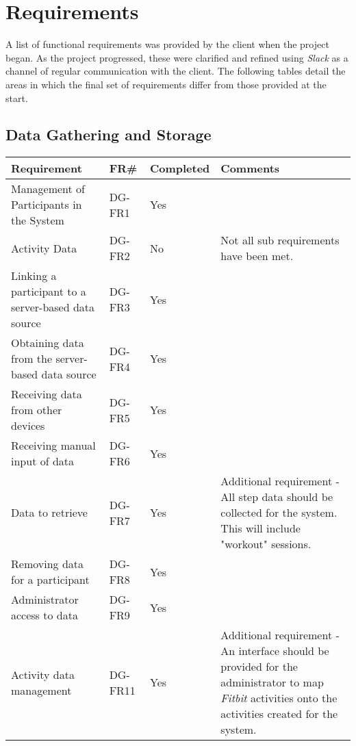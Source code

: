 \label{Requirements_chpt}
\chapter{Requirements}

A list of functional requirements was provided by the client when the project began. As the project progressed, these were clarified and refined using \textit{Slack}\cite{slack} as a channel of regular communication with the client. The following tables detail the areas in which the final set of requirements differ from those provided at the start.

\section{Data Gathering and Storage}
\begin{tabular}{ |p{5cm}|l|l|p{8cm}|}
\hline
\textbf{Requirement}	&	\textbf{FR\#}	&	\textbf{Completed}	&	\textbf{Comments} \\
\hline
Management of Participants in the System			& DG-FR1	& Yes	&  \\
\hline
Activity Data										& DG-FR2	& No	& Not all sub requirements have been met. \\
\hline
Linking a participant to a server-based data source	& DG-FR3	& Yes	&  \\
\hline
Obtaining data from the server-based data source	& DG-FR4	& Yes	&  \\
\hline
Receiving data from other devices					& DG-FR5	& Yes	&  \\
\hline
Receiving manual input of data						& DG-FR6	& Yes	&  \\
\hline
Data to retrieve 									& DG-FR7	& Yes	& Additional requirement - All step data should be collected for the system. This will include "workout" sessions. \\
\hline
Removing data for a participant						& DG-FR8	& Yes	&  \\
\hline
Administrator access to data						& DG-FR9	& Yes	&  \\
\hline
Activity data management							& DG-FR11	& Yes	& Additional requirement - An interface should be provided for the administrator to map \textit{Fitbit} activities onto the activities created for the system. \\
\hline
\end{tabular}

